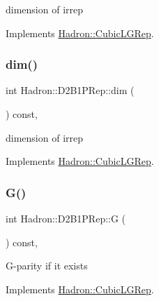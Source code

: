 dimension of irrep 

Implements \mbox{\hyperlink{structHadron_1_1CubicLGRep_a3acbaea26503ed64f20df693a48e4cdd}{Hadron\+::\+Cubic\+L\+G\+Rep}}.

\mbox{\label{structHadron_1_1D2B1PRep_ab30c51be75c1d6ca41fa1d56c9089d2e}} 
\subsubsection{\texorpdfstring{dim()}{dim()}\hspace{0.1cm}{\footnotesize\ttfamily [3/3]}}
{\footnotesize\ttfamily int Hadron\+::\+D2\+B1\+P\+Rep\+::dim (\begin{DoxyParamCaption}{ }\end{DoxyParamCaption}) const\hspace{0.3cm}{\ttfamily [inline]}, {\ttfamily [virtual]}}

dimension of irrep 

Implements \mbox{\hyperlink{structHadron_1_1CubicLGRep_a3acbaea26503ed64f20df693a48e4cdd}{Hadron\+::\+Cubic\+L\+G\+Rep}}.

\mbox{\label{structHadron_1_1D2B1PRep_aedd87d6bd49194a47e13d78217e863c5}} 
\subsubsection{\texorpdfstring{G()}{G()}\hspace{0.1cm}{\footnotesize\ttfamily [1/3]}}
{\footnotesize\ttfamily int Hadron\+::\+D2\+B1\+P\+Rep\+::G (\begin{DoxyParamCaption}{ }\end{DoxyParamCaption}) const\hspace{0.3cm}{\ttfamily [inline]}, {\ttfamily [virtual]}}

G-\/parity if it exists 

Implements \mbox{\hyperlink{structHadron_1_1CubicLGRep_ace26f7b2d55e3a668a14cb9026da5231}{Hadron\+::\+Cubic\+L\+G\+Rep}}.

\mbox{\label{structHadron_1_1D2B1PRep_aedd87d6bd49194a47e13d78217e863c5}} 
